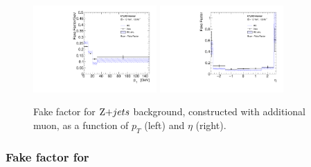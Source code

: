 \begin{figure}[!htb]
  \centering
  \includegraphics[width=0.42\textwidth]{figures/VBSZZ/fakebkg/Muon_2Dff_ptfakeFactorAddMuon_etapt_pavgy.pdf}
  \includegraphics[width=0.42\textwidth]{figures/VBSZZ/fakebkg/Muon_2Dff_etafakeFactorAddMuon_etapt_pavgx.pdf}
  \caption{Fake factor for $\Zjet$ background, constructed with additional muon, as a function of $p_{T}$ (left) and $\eta$ (right).}
  \label{fig:fake_zjet_mu}
\end{figure}

\subsubsection{Fake factor for \ttbar}

